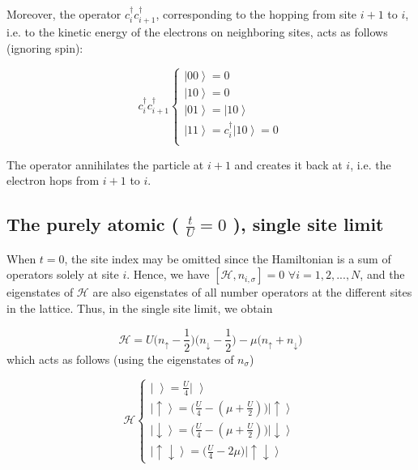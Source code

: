 Moreover, the operator $c_i^\dagger c_{i+1}^\dagger$, corresponding to the hopping from site $i+1$ to $i$, i.e. to the kinetic energy of the electrons on neighboring sites, acts as follows (ignoring spin):

\begin{equation}
c_i^\dagger c_{i+1}^\dagger \begin{cases}
\left|0 0 \right\rangle = 0 \\
\left|1 0 \right\rangle =  0 \\
\left|0 1 \right\rangle =  \left| 1 0 \right\rangle \\
\left|1 1 \right\rangle =  c_i^\dagger \left| 1 0  \right\rangle = 0 \\
\end{cases}
\end{equation}

The operator annihilates the particle at $i+1$ and creates it back at $i$, i.e. the electron hops from $i+1$ to $i$.

\subsection{The purely atomic ( $\frac{t}{U} = 0$ ), single site limit}
\label{subsec:atomic}

When $t = 0$, the site index may be omitted since the Hamiltonian is a sum of operators solely at site $i$.
Hence, we have $[ \mathcal{H}, n_{i,\sigma} ] = 0 \,\, \forall i = 1, 2,..., N $, and the eigenstates of $\mathcal{H}$ are also eigenstates of all number operators at the different sites in the lattice.
Thus, in the single site limit, we obtain

\begin{equation}
\mathcal{H} = U \bigg(n_\uparrow - \frac{1}{2} \bigg) \bigg(n_\downarrow - \frac{1}{2} \bigg) - \mu \bigg( n_\uparrow + n_\downarrow \bigg)
\end{equation}
which acts as follows (using the eigenstates of $n_\sigma$)

\begin{equation}
\mathcal{H} \begin{cases}
\left| \,\, \right\rangle = \frac{U}{4} \left| \,\, \right\rangle \\
\left| \uparrow \right\rangle = \bigg( \frac{U}{4} - (\mu + \frac{U}{2} ) \bigg) \left| \uparrow \right\rangle \\
\left| \downarrow \right\rangle = \bigg( \frac{U}{4} - (\mu + \frac{U}{2} ) \bigg) \left| \downarrow \right\rangle \\
\left| \uparrow \downarrow \right\rangle = \bigg( \frac{U}{4} - 2 \mu \bigg) \left| \uparrow \downarrow \right\rangle
\end{cases}
\end{equation}

